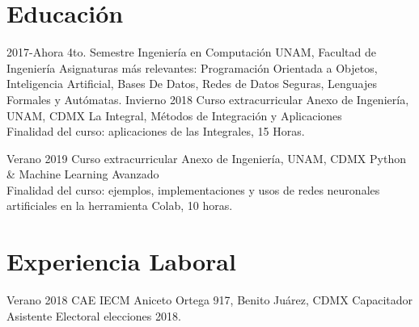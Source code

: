 \documentclass[]{friggeri-cv}
\begin{document}
\section{Educación}
\begin{entrylist}
\entry
    {2017-Ahora}
    {4to. Semestre Ingeniería en Computación}
    {UNAM, Facultad de Ingeniería}
    {Asignaturas más relevantes: Programación Orientada a Objetos, Inteligencia Artificial, Bases De Datos, Redes de Datos Seguras, Lenguajes Formales y Autómatas.
    }
\entry
    {Invierno 2018}
    {Curso extracurricular}
    {Anexo de Ingeniería, UNAM, CDMX}
    {La Integral, Métodos de Integración y Aplicaciones\\
    Finalidad del curso: aplicaciones de las Integrales, 15 Horas.}

\entry
    {Verano 2019}
    {Curso extracurricular}
    {Anexo de Ingeniería, UNAM, CDMX}
    {Python \& Machine Learning Avanzado\\
    Finalidad del curso: ejemplos, implementaciones y usos de redes neuronales artificiales en la herramienta Colab, 10 horas.}

\end{entrylist}

\section{Experiencia Laboral}
\begin{entrylist}
  \entry
    {Verano 2018}
    {CAE IECM}
    {Aniceto Ortega 917, Benito Juárez, CDMX}
    {Capacitador Asistente Electoral elecciones 2018.\\}
  
\end{entrylist}


\end{document}
